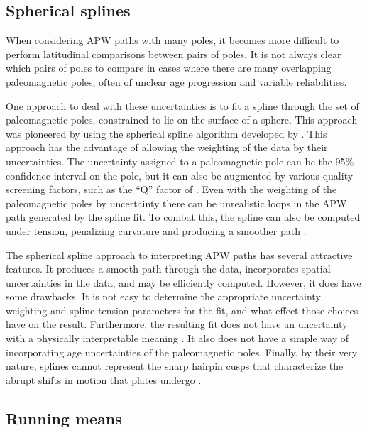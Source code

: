 \documentclass[preprint,12pt,authoryear]{elsarticle}
\begin{document}
\subsection{Spherical splines}

When considering APW paths with many poles, it becomes more difficult to perform
latitudinal comparisons between pairs of poles. It is not always clear which pairs of
poles to compare in cases where there are many overlapping paleomagnetic poles,
often of unclear age progression and variable reliabilities.

One approach to deal with these uncertainties is to fit a spline through the
set of paleomagnetic poles, constrained to lie on the surface of a sphere.
This approach was pioneered by \citet{torsvik1992baltica} using the spherical spline
algorithm developed by \citet{jupp1987fitting}.
This approach has the advantage of allowing the weighting of the data by their
uncertainties. The uncertainty assigned to a paleomagnetic pole can
be the 95\% confidence interval on the pole, but it can also be augmented
by various quality screening factors, such as the ``Q'' factor of \citet{van1990reliability} \citep{torsvik1992baltica}. 
Even with the weighting of the paleomagnetic poles by uncertainty there
can be unrealistic loops in the APW path generated by the spline fit.
To combat this, the spline can also be computed under tension, penalizing
curvature and producing a smoother path \citep{torsvik1996continental}.

The spherical spline approach to interpreting APW paths has several attractive features.
It produces a smooth path through the data, incorporates spatial uncertainties
in the data, and may be efficiently computed.
However, it does have some drawbacks.
It is not easy to determine the appropriate uncertainty weighting and spline
tension parameters for the fit, and what effect those choices have on the result.
Furthermore, the resulting fit does not have an uncertainty with a physically
interpretable meaning \citep{torsvik1996continental}.
It also does not have a simple way of incorporating age uncertainties of the paleomagnetic poles.
Finally, by their very nature, splines cannot represent the sharp hairpin cusps
that characterize the abrupt shifts in motion that plates undergo \citep{irving1972hairpins, gordon1984paleomagnetic}.

\subsection{Running means}
\end{document}
